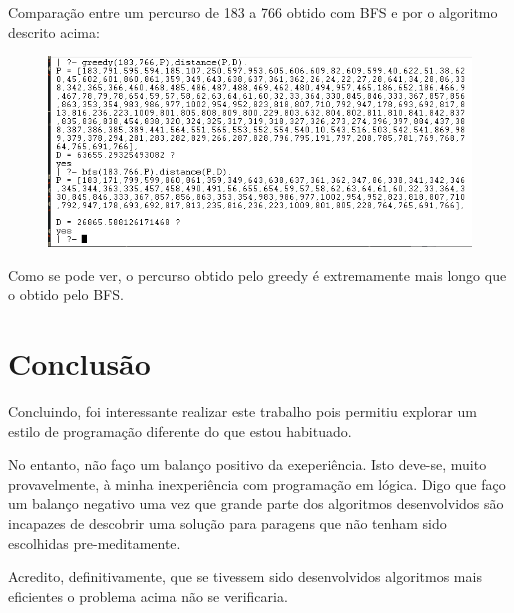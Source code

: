 \documentclass[20pt]{article}
\begin{document}
Comparação entre um percurso de 183 a 766 obtido com BFS e por o algoritmo descrito acima:
 \vspace{1cm}
\begin{figure}[h]
    \centering
    \includegraphics[scale=0.8]{images/greedy_183_766.png}
\end{figure}

Como se pode ver, o percurso obtido pelo greedy é extremamente mais longo que o obtido pelo BFS.

\newpage
\section{Conclusão}
Concluindo, foi interessante realizar este trabalho pois permitiu explorar um estilo de programação diferente do que estou habituado. 

No entanto, não faço um balanço positivo da exeperiência. Isto deve-se, muito provavelmente, à minha inexperiência com programação em lógica. Digo que faço um balanço negativo uma vez que grande parte dos algoritmos desenvolvidos são incapazes de descobrir uma solução para paragens que não tenham sido escolhidas pre-meditamente.

Acredito, definitivamente, que se tivessem sido desenvolvidos algoritmos mais eficientes o problema acima não se verificaria. 
\end{document}
